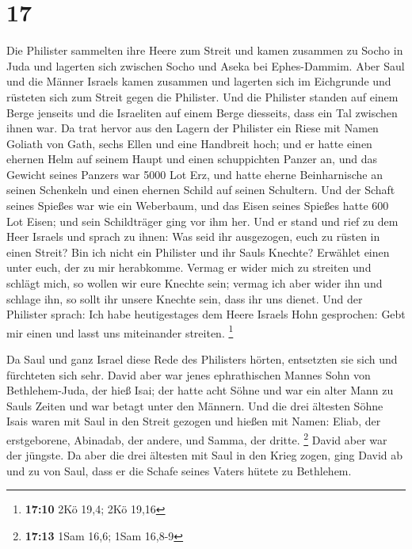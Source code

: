 \hypertarget{section-3}{%
\section{17}\label{section-3}}

 Die Philister sammelten ihre Heere zum Streit und kamen
zusammen zu Socho in Juda und lagerten sich zwischen Socho und Aseka bei
Ephes-Dammim.  Aber Saul und die Männer Israels kamen
zusammen und lagerten sich im Eichgrunde und rüsteten sich zum Streit
gegen die Philister.  Und die Philister standen auf einem
Berge jenseits und die Israeliten auf einem Berge diesseits, dass ein
Tal zwischen ihnen war.  Da trat hervor aus den Lagern der
Philister ein Riese mit Namen Goliath von Gath, sechs Ellen und eine
Handbreit hoch;  und er hatte einen ehernen Helm auf seinem
Haupt und einen schuppichten Panzer an, und das Gewicht seines Panzers
war 5000 Lot Erz,  und hatte eherne Beinharnische an seinen
Schenkeln und einen ehernen Schild auf seinen Schultern. 
Und der Schaft seines Spießes war wie ein Weberbaum, und das Eisen
seines Spießes hatte 600 Lot Eisen; und sein Schildträger ging vor ihm
her.  Und er stand und rief zu dem Heer Israels und sprach
zu ihnen: Was seid ihr ausgezogen, euch zu rüsten in einen Streit? Bin
ich nicht ein Philister und ihr Sauls Knechte? Erwählet einen unter
euch, der zu mir herabkomme.  Vermag er wider mich zu
streiten und schlägt mich, so wollen wir eure Knechte sein; vermag ich
aber wider ihn und schlage ihn, so sollt ihr unsere Knechte sein, dass
ihr uns dienet.  Und der Philister sprach: Ich habe
heutigestages dem Heere Israels Hohn gesprochen: Gebt mir einen und
lasst uns miteinander streiten. \footnote{\textbf{17:10} 2Kö 19,4; 2Kö
  19,16}

 Da Saul und ganz Israel diese Rede des Philisters hörten,
entsetzten sie sich und fürchteten sich sehr.  David aber
war jenes ephrathischen Mannes Sohn von Bethlehem-Juda, der hieß Isai;
der hatte acht Söhne und war ein alter Mann zu Sauls Zeiten und war
betagt unter den Männern.  Und die drei ältesten Söhne
Isais waren mit Saul in den Streit gezogen und hießen mit Namen: Eliab,
der erstgeborene, Abinadab, der andere, und Samma, der dritte.
\footnote{\textbf{17:13} 1Sam 16,6; 1Sam 16,8-9}  David
aber war der jüngste. Da aber die drei ältesten mit Saul in den Krieg
zogen,  ging David ab und zu von Saul, dass er die Schafe
seines Vaters hütete zu Bethlehem.

